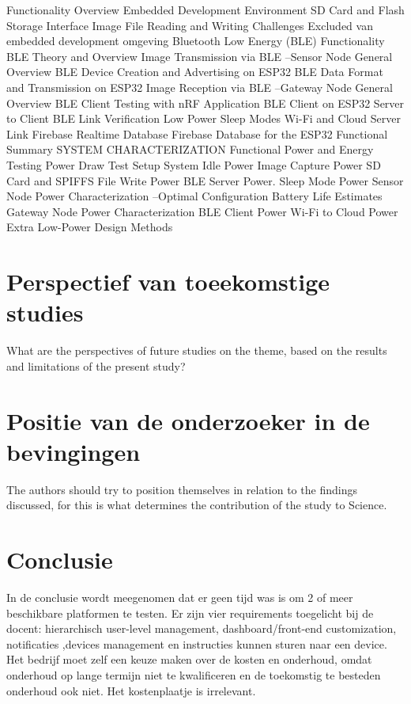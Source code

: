 		Functionality Overview
		Embedded Development Environment
		SD Card and Flash Storage Interface
		Image File Reading and Writing
		Challenges
		Excluded van embedded development omgeving
		Bluetooth Low Energy (BLE) Functionality
		BLE Theory and Overview
		Image Transmission via BLE –Sensor Node
		General Overview
		BLE Device Creation and Advertising on ESP32
		BLE Data Format and Transmission on ESP32
		Image Reception via BLE –Gateway Node
		General Overview
		BLE Client Testing with nRF Application
		BLE Client on ESP32
		Server to Client BLE Link Verification
		Low Power Sleep Modes
		Wi-Fi and Cloud Server Link
		Firebase Realtime Database
		Firebase Database for the ESP32
		Functional Summary
		SYSTEM CHARACTERIZATION
		Functional Power and Energy Testing
		Power Draw Test Setup
		System Idle Power
		Image Capture Power
		SD Card and SPIFFS File Write Power
		BLE Server Power.
		Sleep Mode Power
		Sensor Node Power Characterization –Optimal Configuration
		Battery Life Estimates
		Gateway Node Power Characterization
		BLE Client Power
		Wi-Fi to Cloud Power
		Extra Low-Power Design Methods
		
		
		\section{Perspectief van toeekomstige studies}
		What are the perspectives of future studies on the theme, based on the results and limitations of the present study?
		
		\section{Positie van de onderzoeker in de bevingingen}
		The  authors  should  try  to  position  themselves  in  relation  to  the  findings discussed, for this is what determines the contribution of the study to Science.
		
		\section{Conclusie}
		
		
		In de conclusie wordt  meegenomen dat er geen tijd was is om 2 of meer beschikbare platformen te testen.  Er zijn vier requirements toegelicht bij de docent: hierarchisch user-level management, dashboard/front-end customization, notificaties ,devices management en instructies kunnen sturen naar een device. Het bedrijf moet zelf een keuze maken over de kosten en onderhoud, omdat onderhoud op lange termijn niet te kwalificeren en de toekomstig te besteden onderhoud ook niet. Het kostenplaatje is irrelevant.  
		
